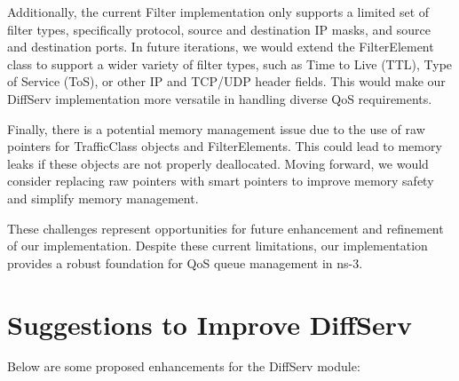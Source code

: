 \documentclass{article}
\begin{document}
Additionally, the current Filter implementation only supports a limited set of filter types, specifically protocol, source and destination IP masks, and source and destination ports. In future iterations, we would extend the FilterElement class to support a wider variety of filter types, such as Time to Live (TTL), Type of Service (ToS), or other IP and TCP/UDP header fields. This would make our DiffServ implementation more versatile in handling diverse QoS requirements.

Finally, there is a potential memory management issue due to the use of raw pointers for TrafficClass objects and FilterElements. This could lead to memory leaks if these objects are not properly deallocated. Moving forward, we would consider replacing raw pointers with smart pointers to improve memory safety and simplify memory management.

These challenges represent opportunities for future enhancement and refinement of our implementation. Despite these current limitations, our implementation provides a robust foundation for QoS queue management in ns-3. 

\section{Suggestions to Improve DiffServ}
\label{sec:improvements}

Below are some proposed enhancements for the DiffServ module:
\end{document}
